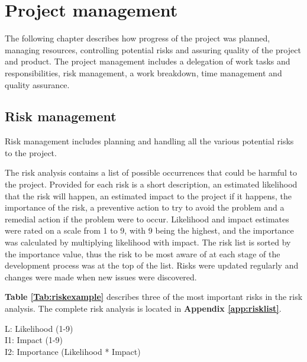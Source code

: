 
\chapter{Project management}

The following chapter describes how progress of the project was planned, managing resources, controlling potential risks and assuring quality of the project and product. The project management includes a delegation of work tasks and responsibilities, risk management, a work breakdown, time management and quality assurance.

\section{Risk management}
\label{sec:risk_management}

Risk management includes planning and handling all the various potential risks to the project.\newline

The risk analysis contains a list of possible occurrences that could be harmful to the project. Provided for each risk is a short description, an estimated likelihood that the risk will happen, an estimated impact to the project if it happens, the importance of the risk, a preventive action to try to avoid the problem and a remedial action if the problem were to occur. Likelihood and impact estimates were rated on a scale from 1 to 9, with 9 being the highest, and the importance was calculated by multiplying likelihood with impact. The risk list is sorted by the importance value, thus the risk to be most aware of at each stage of the development process was at the top of the list. Risks were updated regularly and changes were made when new issues were discovered.\newline

\textbf{Table \ref{Tab:riskexample}} describes three of the most important risks in the risk analysis. The complete risk analysis is located in \textbf{Appendix \ref{app:risklist}}.

L: Likelihood (1-9)\\
I1: Impact (1-9)\\
I2: Importance (Likelihood * Impact)\\

